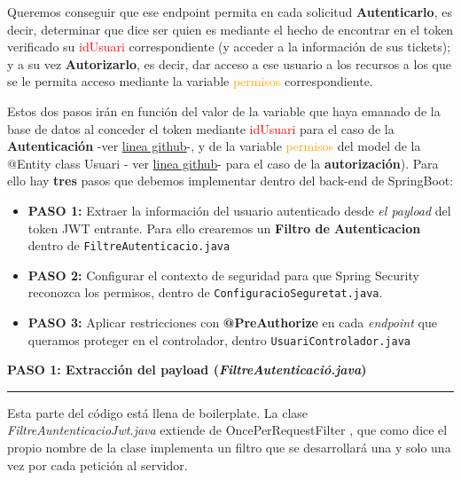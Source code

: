 \documentclass[a4paper,12pt]{report}
\begin{document}
		 Queremos conseguir que ese endpoint permita en cada solicitud \textbf{Autenticarlo}, es decir, determinar que dice ser quien es mediante el hecho de encontrar en el token verificado su \textcolor{red}{idUsuari} correspondiente (y acceder a la información de sus tickets); y a su vez \textbf{Autorizarlo}, es decir, dar acceso a ese usuario a los recursos a los que se le permita acceso mediante la variable \textcolor{orange}{permisos} correspondiente.
		
		 Estos dos pasos irán en función del valor de la variable que haya emanado de la base de datos al conceder el token mediante \textcolor{red}{idUsuari} para el caso de la \textbf{Autenticación} -ver \href{https://github.com/blackcub3s/mercApp/blob/b01cec515bb9af27a1faa24258abb4313ef275cd/APP%20WEB/__springboot__produccio__/app/src/main/java/miApp/app/Usuaris/model/Usuari.java#L30}{linea github}-, y de la variable \textcolor{orange}{permisos} del model de la @Entity class Usuari - ver \href{https://github.com/blackcub3s/mercApp/blob/b01cec515bb9af27a1faa24258abb4313ef275cd/APP%20WEB/__springboot__produccio__/app/src/main/java/miApp/app/Usuaris/model/Usuari.java#L42}{linea github}- para el caso de la \textbf{autorización}). Para ello hay \textbf{tres} pasos que debemos implementar dentro del back-end de SpringBoot:
		
		
		
		
		\begin{itemize} 
			\setlength{\itemsep}{-1.5em}
			\item \textbf{PASO 1:} Extraer la información del usuario autenticado desde \textit{el payload} del token JWT entrante. Para ello crearemos un \textbf{Filtro de Autenticacion} dentro de \texttt{FiltreAutenticacio.java}\\
			\item \textbf{PASO 2:} Configurar el contexto de seguridad para que Spring Security reconozca los permisos, dentro de  \texttt{ConfiguracioSeguretat.java}. \\ 	
			\item \textbf{PASO 3:} Aplicar restricciones con \textbf{@PreAuthorize} en cada \textit{endpoint} que queramos proteger en el controlador, dentro \texttt{UsuariControlador.java}
		\end{itemize}
		

		\noindent \textbf{PASO 1: Extracción del payload (\textit{FiltreAutenticació.java})}
		\hrule
		
		Esta parte del código está llena de boilerplate. La clase \textit{FiltreAuntenticacioJwt.java} extiende de OncePerRequestFilter \cite{oncePerRequestFilter}, que como dice el propio nombre de la clase implementa un filtro que se desarrollará una y solo una vez por cada petición al servidor.
		
\end{document}
